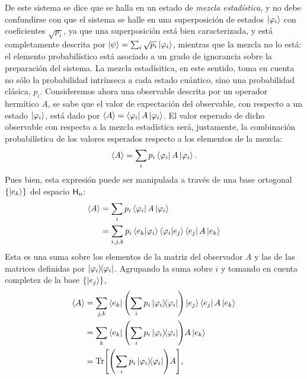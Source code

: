De este sistema se dice que se halla en un estado de \textit{mezcla estadística}, y no debe confundirse con que el sistema se halle en una superposición de estados $\ket{\varphi_{i}}$ con coeficientes $\sqrt{p_{i}}$, ya que una superposición está bien caracterizada, y está completamente descrita por $\ket{\psi}=\sum_{i}\sqrt{p_{i}}\ket{\varphi_{i}}$, mientras que la mezcla no lo está: el elemento probabilístico está asociado a un grado de ignorancia sobre la preparación del sistema. La mezcla estadísitica, en este sentido, toma en cuenta no sólo la probabilidad intrínseca a cada estado cuántico, sino una probabilidad clásica, $p_{i}$. Consideremos ahora una observable descrita por un operador hermítico $A$, se sabe que el valor de expectación del observable, con respecto a un estado $\ket{\varphi_{i}}$, está dado por $\expval{A}=\bra{\varphi_{i}}A\ket{\varphi_{i}}$. El valor esperado de dicho observable con respecto a la mezcla estadística será, justamente, la combinación probabilística de los valores esperados respecto a los elementos de la mezcla:
\begin{equation*}
\expval{A}=\sum_{i}p_{i}\bra{\varphi_{i}}A\ket{\varphi_{i}}.
\end{equation*}
Pues bien, esta expresión puede ser manipulada a través de una base ortogonal $\{\ket{e_{k}}\}$ del espacio ${\sf H}_{n}$:
\begin{align*}
\expval{A}&=\sum_{i}p_{i}\bra{\varphi_{i}}A\ket{\varphi_{i}}\\
&=\sum_{i,j,k}p_{i}\bra{e_{k}}\ket{\varphi_{i}}\bra{\varphi_{i}}\ket{e_{j}} \bra{e_{j}}A\ket{e_{k}}\\
\end{align*}
Esta es una suma sobre los elementos de la matriz del observador $A$ y las de las matrices definidas por $\dyad{\varphi_{i}}$. Agrupando la suma sobre $i$ y tomando en cuenta completez de la base $\{\ket{e_{j}}\}$,
\begin{align*}
\expval{A}&=\sum_{j,k}\bra{e_{k}}\qty(\sum_{i}p_{i}\dyad{\varphi_{i}})\ket{e_{j}} \bra{e_{j}}A\ket{e_{k}}\\
&=\sum_{k}\bra{e_{k}}\qty(\sum_{i}p_{i}\dyad{\varphi_{i}})A\ket{e_{k}}\\
&=\Tr[\qty(\sum_{i}p_{i}\dyad{\varphi_{i}})A]\rlap{,}
\end{align*}
